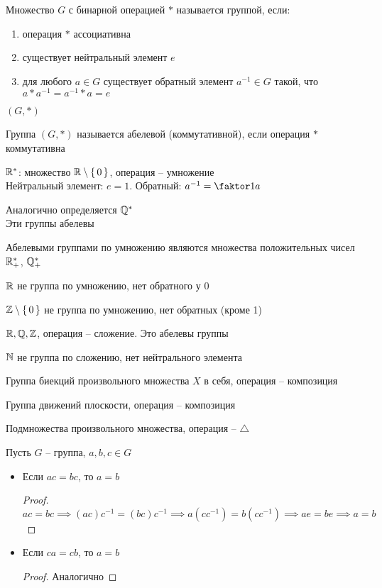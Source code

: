 \begin{definition}
	Множество $G$ с бинарной операцией $*$ называется группой, если:
	\begin{enumerate}
		\item операция $*$ ассоциативна
		\item существует нейтральный элемент $e$
		\item для любого $a \in G$ существует обратный элемент $a^{-1} \in G$ такой, что $a * a^{-1} = a^{-1} * a = e$
	\end{enumerate}
\end{definition}

\begin{notation}
	$(G, *)$
\end{notation}

\begin{definition}
	Группа $(G, *)$ называется абелевой (коммутативной), если операция $*$ коммутативна
\end{definition}

\begin{exmpls}
	\item $\mathbb{R}^*$: множество $\mathbb{R} \setminus \set{0}$, операция -- умножение \\
	Нейтральный элемент: $e = 1$. Обратный: $a^{-1} = \faktor1a$
	\item Аналогично определяется $\mathbb{Q}^*$ \\
	Эти группы абелевы
	\item Абелевыми группами по умножению являются множества положительных чисел $\mathbb{R}_+^*$, $\mathbb{Q}_+^*$
	\item $\mathbb{R}$ не группа по умножению, нет обратного у $0$
	\item $\mathbb{Z} \setminus \set{0}$ не группа по умножению, нет обратных (кроме 1)
	\item $\mathbb{R}, \mathbb{Q}, \mathbb{Z}$, операция -- сложение. Это абелевы группы
	\item $\mathbb{N}$ не группа по сложению, нет нейтрального элемента
	\item Группа биекций произвольного множества $X$ в себя, операция -- композиция
	\item Группа движений плоскости, операция -- композиция
	\item Подмножества произвольного множества, операция -- $\triangle$
\end{exmpls}

\begin{property}[сокращение]
	Пусть $G$ -- группа, $a, b, c \in G$
	\begin{itemize}
		\item Если $ac = bc$, то $a = b$
		\begin{proof}
			$ ac = bc \implies (ac)c^{-1} = (bc)c^{-1} \implies a(cc^{-1}) = b(cc^{-1}) \implies ae = be \implies a = b $
		\end{proof}
		\item Если $ca = cb$, то $a = b$
		\begin{proof}
			Аналогично
		\end{proof}
	\end{itemize}
\end{property}

